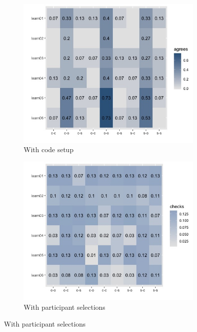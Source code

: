\documentclass{article}
\begin{document}
\begin{figure}[h!]
  \centering
  \begin{subfigure}[t]{0.45\textwidth}
    \centering
    \includegraphics[width=\linewidth]{th_norm} 
    \caption{With code setup}
  \end{subfigure}
  \hfill
  \begin{subfigure}[t]{0.45\textwidth}
    \centering
    \includegraphics[width=\linewidth]{th_ppt} 
    \caption{With participant selections}
  \end{subfigure}
  \label{fig:theory_comp}
\end{figure}
\end{document}
